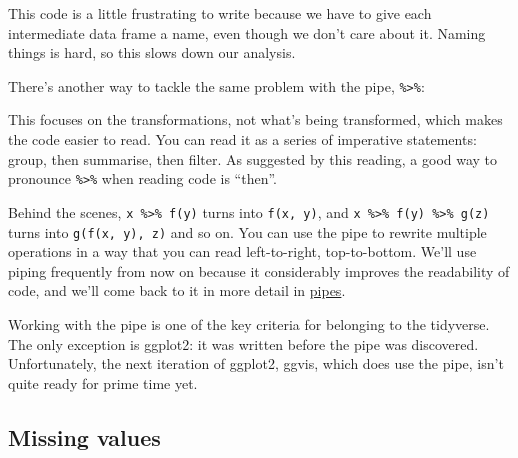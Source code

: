 \documentclass[]{book}
\newenvironment{Shaded}{\begin{snugshade}}{\end{snugshade}}
\newcommand{\KeywordTok}[1]{\textcolor[rgb]{0.13,0.29,0.53}{\textbf{{#1}}}}
\newcommand{\DataTypeTok}[1]{\textcolor[rgb]{0.13,0.29,0.53}{{#1}}}
\newcommand{\DecValTok}[1]{\textcolor[rgb]{0.00,0.00,0.81}{{#1}}}
\newcommand{\StringTok}[1]{\textcolor[rgb]{0.31,0.60,0.02}{{#1}}}
\newcommand{\OtherTok}[1]{\textcolor[rgb]{0.56,0.35,0.01}{{#1}}}
\newcommand{\NormalTok}[1]{{#1}}
\begin{document}
This code is a little frustrating to write because we have to give each
intermediate data frame a name, even though we don't care about it.
Naming things is hard, so this slows down our analysis.

There's another way to tackle the same problem with the pipe,
\texttt{\%\textgreater{}\%}:

\begin{Shaded}
\end{Shaded}

This focuses on the transformations, not what's being transformed, which
makes the code easier to read. You can read it as a series of imperative
statements: group, then summarise, then filter. As suggested by this
reading, a good way to pronounce \texttt{\%\textgreater{}\%} when
reading code is ``then''.

Behind the scenes, \texttt{x\ \%\textgreater{}\%\ f(y)} turns into
\texttt{f(x,\ y)}, and
\texttt{x\ \%\textgreater{}\%\ f(y)\ \%\textgreater{}\%\ g(z)} turns
into \texttt{g(f(x,\ y),\ z)} and so on. You can use the pipe to rewrite
multiple operations in a way that you can read left-to-right,
top-to-bottom. We'll use piping frequently from now on because it
considerably improves the readability of code, and we'll come back to it
in more detail in \protect\hyperlink{pipes}{pipes}.

Working with the pipe is one of the key criteria for belonging to the
tidyverse. The only exception is ggplot2: it was written before the pipe
was discovered. Unfortunately, the next iteration of ggplot2, ggvis,
which does use the pipe, isn't quite ready for prime time yet.

\subsection{Missing values}\label{missing-values-1}
\end{document}
